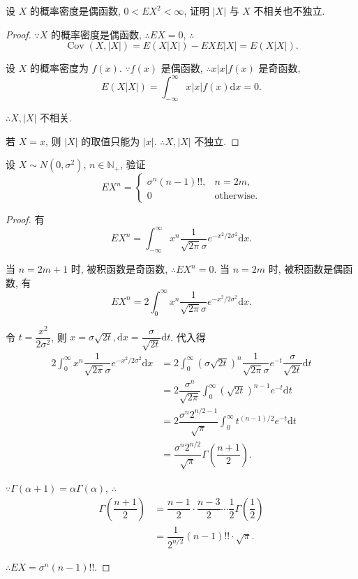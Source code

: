\documentclass[color=black,device=normal,lang=cn]{elegantnote}
\numberwithin{equation}{section}
\theoremstyle{plain}
\numberwithin{exercise}{exsection}
\begin{document}
\begin{exercise}%
    设 $X$ 的概率密度是偶函数, $0<EX^2<\infty$, 证明 $|X|$ 与 $X$ 不相关也不独立.
\end{exercise}
\begin{proof}
    $\because X$ 的概率密度是偶函数, $\therefore EX=0$, $\therefore$
    \[\operatorname{Cov}(X,|X|)=E(X|X|)-EXE|X|=E(X|X|).\]

    设 $X$ 的概率密度为 $f(x)$. $\because f(x)$ 是偶函数, $\therefore x|x|f(x)$ 是奇函数,
    \[E(X|X|)=\int_{-\infty}^\infty x|x|f(x)\mathrm{d}x=0.\]

    $\therefore X,|X|$ 不相关.

    若 $X=x$, 则 $|X|$ 的取值只能为 $|x|$. $\therefore X,|X|$ 不独立.
\end{proof}
\begin{exercise}%
    设 $X\sim N(0,\sigma^2)$, $n\in\mathbb{N}_+$, 验证
    \[EX^n=\begin{cases}
        \sigma^n(n-1)!!, & n=2m, \\
        0 & \text{otherwise}.
    \end{cases}\]
\end{exercise}
\begin{proof}
    有
    \[EX^n=\int_{-\infty}^\infty x^n\dfrac{1}{\sqrt{2\pi}\sigma}e^{-x^2/2\sigma^2}\mathrm{d}x.\]

    当 $n=2m+1$ 时, 被积函数是奇函数, $\therefore EX^n=0$. 当 $n=2m$ 时, 被积函数是偶函数, 有
    \[EX^n=2\int_0^\infty x^n\dfrac{1}{\sqrt{2\pi}\sigma}e^{-x^2/2\sigma^2}\mathrm{d}x.\]

    令 $t=\dfrac{x^2}{2\sigma^2}$, 则 $x=\sigma\sqrt{2t},\mathrm{d}x=\dfrac{\sigma}{\sqrt{2t}}\mathrm{d}t$. 代入得
    \begin{align*}
        2\int_0^\infty x^n\dfrac{1}{\sqrt{2\pi}\sigma}e^{-x^2/2\sigma^2}\mathrm{d}x & =2\int_0^\infty(\sigma\sqrt{2t})^n\dfrac{1}{\sqrt{2\pi}\sigma}e^{-t}\dfrac{\sigma}{\sqrt{2t}}\mathrm{d}t \\
        & =2\dfrac{\sigma^n}{\sqrt{2\pi}}\int_0^\infty(\sqrt{2t})^{n-1}e^{-t}\mathrm{d}t \\
        & =2\dfrac{\sigma^n2^{n/2-1}}{\sqrt{\pi}}\int_0^\infty t^{(n-1)/2}e^{-t}\mathrm{d}t \\
        & =\dfrac{\sigma^n2^{n/2}}{\sqrt{\pi}}\Gamma\left(\dfrac{n+1}{2}\right).
    \end{align*}

    $\because\Gamma(\alpha+1)=\alpha\Gamma(\alpha)$, $\therefore$
    \begin{align*}
        \Gamma\left(\dfrac{n+1}{2}\right) & =\dfrac{n-1}{2}\cdot\dfrac{n-3}{2}\cdots\dfrac{1}{2}\Gamma\left(\dfrac{1}{2}\right) \\
        & =\dfrac{1}{2^{n/2}}(n-1)!!\cdot\sqrt{\pi}.
    \end{align*}

    $\therefore EX=\sigma^n(n-1)!!$.
\end{proof}
\end{document}
